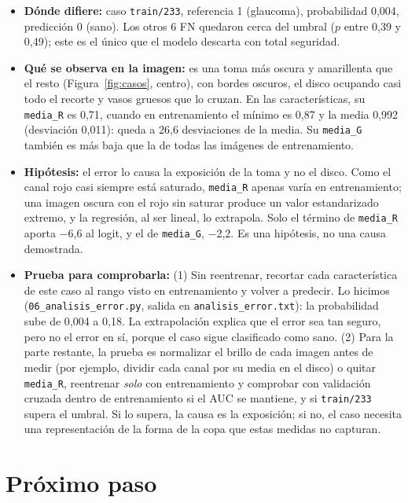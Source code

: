 \documentclass[pdflatex,sn-mathphys-num]{sn-jnl}%
\theoremstyle{thmstyleone}%
\theoremstyle{thmstyletwo}%
\theoremstyle{thmstylethree}%
\begin{document}
\begin{itemize}
\item \textbf{Dónde difiere:} caso \texttt{train/233}, referencia 1 (glaucoma), probabilidad 0,004, predicción 0 (sano). Los otros 6 FN quedaron cerca del umbral ($p$ entre 0,39 y 0,49); este es el único que el modelo descarta con total seguridad.
\item \textbf{Qué se observa en la imagen:} es una toma más oscura y amarillenta que el resto (Figura~\ref{fig:casos}, centro), con bordes oscuros, el disco ocupando casi todo el recorte y vasos gruesos que lo cruzan. En las características, su \texttt{media\_R} es 0,71, cuando en entrenamiento el mínimo es 0,87 y la media 0,992 (desviación 0,011): queda a 26,6 desviaciones de la media. Su \texttt{media\_G} también es más baja que la de todas las imágenes de entrenamiento.
\item \textbf{Hipótesis:} el error lo causa la exposición de la toma y no el disco. Como el canal rojo casi siempre está saturado, \texttt{media\_R} apenas varía en entrenamiento; una imagen oscura con el rojo sin saturar produce un valor estandarizado extremo, y la regresión, al ser lineal, lo extrapola. Solo el término de \texttt{media\_R} aporta $-$6,6 al logit, y el de \texttt{media\_G}, $-$2,2. Es una hipótesis, no una causa demostrada.
\item \textbf{Prueba para comprobarla:} (1) Sin reentrenar, recortar cada característica de este caso al rango visto en entrenamiento y volver a predecir. Lo hicimos (\texttt{06\_analisis\_error.py}, salida en \texttt{analisis\_error.txt}): la probabilidad sube de 0,004 a 0,18. La extrapolación explica que el error sea tan seguro, pero no el error en sí, porque el caso sigue clasificado como sano. (2) Para la parte restante, la prueba es normalizar el brillo de cada imagen antes de medir (por ejemplo, dividir cada canal por su media en el disco) o quitar \texttt{media\_R}, reentrenar \emph{solo} con entrenamiento y comprobar con validación cruzada dentro de entrenamiento si el AUC se mantiene, y si \texttt{train/233} supera el umbral. Si lo supera, la causa es la exposición; si no, el caso necesita una representación de la forma de la copa que estas medidas no capturan.
\end{itemize}

\section{Próximo paso}\label{sec:siguiente}
\end{document}
